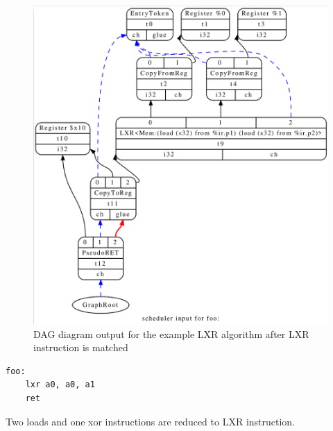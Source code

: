 \begin{figure}
    \centering
    \includegraphics[scale=0.25]{adding_new_instr/lxr_match.png}
    \caption{DAG diagram output for the example LXR algorithm after LXR instruction is matched}
    \label{fig:lxr_match}
\end{figure}


\begin{lstlisting}[caption= Assembly output with LXR instruction]
foo:               
	lxr	a0, a0, a1
	ret
\end{lstlisting}

Two loads and one xor instructions are reduced to LXR instruction.
